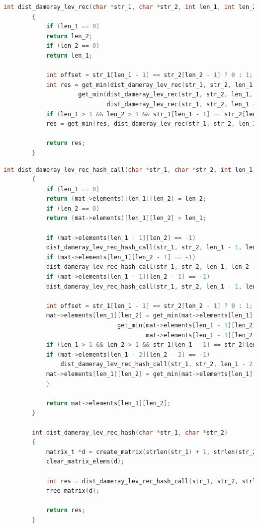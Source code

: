 \documentclass[12pt]{report}
\begin{document}
	\bigbreak

	\begin{lstlisting}[label=damlevrec,caption=Листинг рекурсивного алгоритма поиска расстояния Дамерау-Левенштейна,language=C]
		int dist_dameray_lev_rec(char *str_1, char *str_2, int len_1, int len_2)
		{
		    if (len_1 == 0)
			return len_2;
		    if (len_2 == 0)
			return len_1;

		    int offset = str_1[len_1 - 1] == str_2[len_2 - 1] ? 0 : 1;
		    int res = get_min(dist_dameray_lev_rec(str_1, str_2, len_1 - 1, len_2) + 1,
				     get_min(dist_dameray_lev_rec(str_1, str_2, len_1, len_2 - 1) + 1,
				             dist_dameray_lev_rec(str_1, str_2, len_1 - 1, len_2 - 1) + offset));
		    if (len_1 > 1 && len_2 > 1 && str_1[len_1 - 1] == str_2[len_2 - 2] && str_1[len_1 - 2] == str_2[len_2 - 1])
			res = get_min(res, dist_dameray_lev_rec(str_1, str_2, len_1 - 2, len_2 - 2) + 1);

		    return res;
		}
	\end{lstlisting}
	
	\begin{lstlisting}[label=damlevrechash,caption=Листинг рекурсивного алгоритма поиска расстояния Дамерау-Левенштейна с кешем,language=C]	
		int dist_dameray_lev_rec_hash_call(char *str_1, char *str_2, int len_1, int len_2, matrix_t *mat)
		{
		    if (len_1 == 0)
			return (mat->elements)[len_1][len_2] = len_2;
		    if (len_2 == 0)
			return (mat->elements)[len_1][len_2] = len_1;

		    if (mat->elements[len_1 - 1][len_2] == -1)
			dist_dameray_lev_rec_hash_call(str_1, str_2, len_1 - 1, len_2, mat);
		    if (mat->elements[len_1][len_2 - 1] == -1)
			dist_dameray_lev_rec_hash_call(str_1, str_2, len_1, len_2 - 1, mat);
		    if (mat->elements[len_1 - 1][len_2 - 1] == -1)
			dist_dameray_lev_rec_hash_call(str_1, str_2, len_1 - 1, len_2 - 1, mat);

		    int offset = str_1[len_1 - 1] == str_2[len_2 - 1] ? 0 : 1;
		    mat->elements[len_1][len_2] = get_min(mat->elements[len_1][len_2 - 1] + 1,
				                get_min(mat->elements[len_1 - 1][len_2] + 1,
				                        mat->elements[len_1 - 1][len_2 - 1] + offset));
		    if (len_1 > 1 && len_2 > 1 && str_1[len_1 - 1] == str_2[len_2 - 2] && str_1[len_1 - 2] == str_2[len_2 - 1]) {
			if (mat->elements[len_1 - 2][len_2 - 2] == -1)
			    dist_dameray_lev_rec_hash_call(str_1, str_2, len_1 - 2, len_2 - 2, mat);
			mat->elements[len_1][len_2] = get_min(mat->elements[len_1][len_2], mat->elements[len_1 - 2][len_2 - 2] + 1);
		    }

		    return mat->elements[len_1][len_2];
		}

		int dist_dameray_lev_rec_hash(char *str_1, char *str_2)
		{
		    matrix_t *d = create_matrix(strlen(str_1) + 1, strlen(str_2) + 1);
		    clear_matrix_elems(d);

		    int res = dist_dameray_lev_rec_hash_call(str_1, str_2, strlen(str_1), strlen(str_2), d);
		    free_matrix(d);

		    return res;
		}
	\end{lstlisting}
\end{document}
